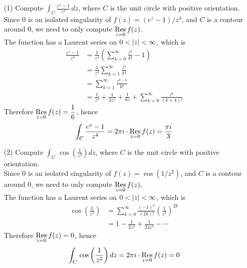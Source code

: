 \begin{example}\hfill
\begin{itemize}[itemsep=1em]
\item[(1)] Compute $\displaystyle \int_C\frac{e^z - 1}{z^4}\,dz$, where $C$ is the unit circle with positive orientation.\\[0.5em]
Since $0$ is an isolated singularity of $f(z) = (e^z - 1)/z^4$, and $C$ is a contour around $0$, we need to only compute $\underset{z = {0}}{\operatorname{Res}}\,f(z)$.\\[0.5em]
The function has a Laurent series on $0 < \left\lvert z\right\rvert < \infty$, which is
\begin{align*}
\frac{e^z - 1}{z^4} &= \frac{1}{z^4}\left(\sum_{k=0}^\infty\frac{z^k}{k!} - 1\right)\\[0.5em]
 &= \frac{1}{z^4}\sum_{k=1}^\infty\frac{z^k}{k!}\\[0.5em]
 &= \sum_{k=1}^\infty\frac{z^{k-4}}{k!}\\[0.5em]
 &= \frac{1}{z^3} + \frac{1}{2z^2} + \frac{1}{6z} + \sum_{k=0}^\infty\frac{z^k}{(k+4)!}
\end{align*}
Therefore $\underset{z = {0}}{\operatorname{Res}}\,f(z) = \dfrac{1}{6}$, hence 
\[\int_C\frac{e^z - 1}{z^4} = 2\pi i\cdot\underset{z = {0}}{\operatorname{Res}}\,f(z) = \frac{\pi i}{3}\]

\item[(2)] Compute $\displaystyle \int_C\,\cos\left(\frac{1}{z^2}\right)dz$, where $C$ is the unit circle with positive orientation.\\[0.5em]
Since $0$ is an isolated singularity of $f(z) = \cos(1/z^2)$, and $C$ is a contour around $0$, we need to only compute $\underset{z = {0}}{\operatorname{Res}}\,f(z)$.\\[0.5em]
The function has a Laurent series on $0 < \left\lvert z\right\rvert < \infty$, which is
\begin{align*}
\cos\left(\frac{1}{z^2}\right) &= \sum_{k=0}^\infty\frac{(-1)^k}{(2k)!}\left(\frac{1}{z^2}\right)^{2k}\\[0.5em]
 &= 1 - \frac{1}{2z^2} + \frac{1}{24z^4} - \cdots
\end{align*}
Therefore $\underset{z = {0}}{\operatorname{Res}}\,f(z) = 0$, hence 
\[\int_C\,\cos\left(\frac{1}{z^2}\right)dz = 2\pi i\cdot\underset{z = {0}}{\operatorname{Res}}\,f(z) = 0\]


\end{itemize}
\end{example}
